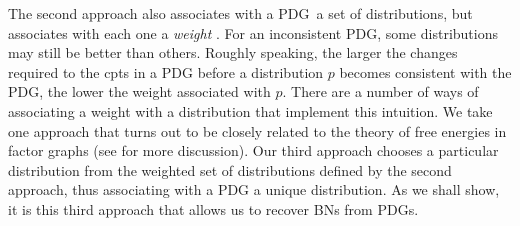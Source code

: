 \documentclass{article}
\newcommand{\commentout}[1]{\ignorespaces}
\newcommand{\MN}{PDG}
\numberwithin{equation}{section}
\begin{document}
The second approach also associates with a \MN\ a set of
  distributions, but associates with each one a \emph{weight}
  \parencite[cf.][]{halpern2015weighted}.  For an inconsistent \MN,
  some distributions may still be better than others.
  Roughly speaking, the larger the changes required to the cpts in a PDG
before a distribution $p$ becomes consistent with the PDG, the lower
the weight associated with $p$.  There are a number of ways of
associating a weight with a distribution that implement this
intuition.  We take one approach that turns out to be closely related
to the theory of free energies in factor graphs (see
 for more discussion).
  Our third approach chooses a particular
          distribution from the weighted set of distributions defined
          by the second approach, thus associating with a PDG a unique
          distribution.  
	As we shall show, it is this third approach that allows us to
        recover BNs from PDGs. 
\end{document}
